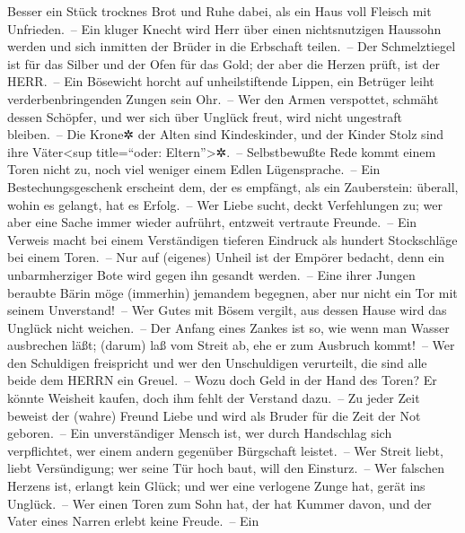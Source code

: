 Besser ein Stück trocknes Brot und Ruhe dabei, als ein
Haus voll Fleisch mit Unfrieden.~-- Ein kluger Knecht wird
Herr über einen nichtsnutzigen Haussohn werden und sich inmitten der
Brüder in die Erbschaft teilen.~-- Der Schmelztiegel ist
für das Silber und der Ofen für das Gold; der aber die Herzen prüft, ist
der HERR.~-- Ein Bösewicht horcht auf unheilstiftende
Lippen, ein Betrüger leiht verderbenbringenden Zungen sein Ohr.~--
Wer den Armen verspottet, schmäht dessen Schöpfer, und wer
sich über Unglück freut, wird nicht ungestraft bleiben.~--
Die Krone✲ der Alten sind Kindeskinder, und der Kinder
Stolz sind ihre Väter\textless sup title=``oder:
Eltern''\textgreater✲.~-- Selbstbewußte Rede kommt einem
Toren nicht zu, noch viel weniger einem Edlen Lügensprache.~--
Ein Bestechungsgeschenk erscheint dem, der es empfängt,
als ein Zauberstein: überall, wohin es gelangt, hat es Erfolg.~--
Wer Liebe sucht, deckt Verfehlungen zu; wer aber eine
Sache immer wieder aufrührt, entzweit vertraute Freunde.~--
Ein Verweis macht bei einem Verständigen tieferen
Eindruck als hundert Stockschläge bei einem Toren.~-- Nur
auf (eigenes) Unheil ist der Empörer bedacht, denn ein unbarmherziger
Bote wird gegen ihn gesandt werden.~-- Eine ihrer Jungen
beraubte Bärin möge (immerhin) jemandem begegnen, aber nur nicht ein Tor
mit seinem Unverstand!~-- Wer Gutes mit Bösem vergilt,
aus dessen Hause wird das Unglück nicht weichen.~-- Der
Anfang eines Zankes ist so, wie wenn man Wasser ausbrechen läßt; (darum)
laß vom Streit ab, ehe er zum Ausbruch kommt!~-- Wer den
Schuldigen freispricht und wer den Unschuldigen verurteilt, die sind
alle beide dem HERRN ein Greuel.~-- Wozu doch Geld in der
Hand des Toren? Er könnte Weisheit kaufen, doch ihm fehlt der Verstand
dazu.~-- Zu jeder Zeit beweist der (wahre) Freund Liebe
und wird als Bruder für die Zeit der Not geboren.~-- Ein
unverständiger Mensch ist, wer durch Handschlag sich verpflichtet, wer
einem andern gegenüber Bürgschaft leistet.~-- Wer Streit
liebt, liebt Versündigung; wer seine Tür hoch baut, will den
Einsturz.~-- Wer falschen Herzens ist, erlangt kein
Glück; und wer eine verlogene Zunge hat, gerät ins Unglück.~--
Wer einen Toren zum Sohn hat, der hat Kummer davon, und
der Vater eines Narren erlebt keine Freude.~-- Ein
